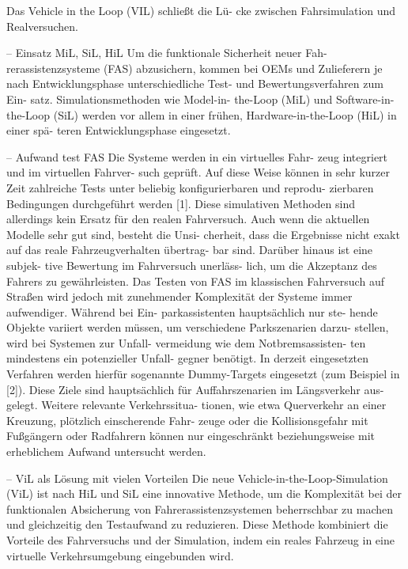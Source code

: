 Das Vehicle in the Loop (VIL) schließt die Lü- cke zwischen Fahrsimulation und Realversuchen.


-- Einsatz MiL, SiL, HiL
Um die funktionale Sicherheit neuer Fah- rerassistenzsysteme (FAS) abzusichern, kommen bei OEMs und Zulieferern je nach Entwicklungsphase unterschiedliche Test- und Bewertungsverfahren zum Ein- satz. Simulationsmethoden wie Model-in- the-Loop (MiL) und Software-in-the-Loop (SiL) werden vor allem in einer frühen, Hardware-in-the-Loop (HiL) in einer spä- teren Entwicklungsphase eingesetzt. \cite{schwab2014durchgangige}

-- Aufwand test FAS
Die Systeme werden in ein virtuelles Fahr- zeug integriert und im virtuellen Fahrver- such geprüft. Auf diese Weise können in sehr kurzer Zeit zahlreiche Tests unter beliebig konfigurierbaren und reprodu- zierbaren Bedingungen durchgeführt werden [1]. Diese simulativen Methoden sind allerdings kein Ersatz für den realen Fahrversuch. Auch wenn die aktuellen Modelle sehr gut sind, besteht die Unsi- cherheit, dass die Ergebnisse nicht exakt auf das reale Fahrzeugverhalten übertrag- bar sind. Darüber hinaus ist eine subjek- tive Bewertung im Fahrversuch unerläss- lich, um die Akzeptanz des Fahrers zu gewährleisten. Das Testen von FAS im klassischen Fahrversuch auf Straßen wird jedoch mit zunehmender Komplexität der Systeme immer aufwendiger. Während bei Ein- parkassistenten hauptsächlich nur ste- hende Objekte variiert werden müssen, um verschiedene Parkszenarien darzu- stellen, wird bei Systemen zur Unfall- vermeidung wie dem Notbremsassisten- ten mindestens ein potenzieller Unfall- gegner benötigt. In derzeit eingesetzten Verfahren werden hierfür sogenannte Dummy-Targets eingesetzt (zum Beispiel in [2]). Diese Ziele sind hauptsächlich für Auffahrszenarien im Längsverkehr aus- gelegt. Weitere relevante Verkehrssitua- tionen, wie etwa Querverkehr an einer Kreuzung, plötzlich einscherende Fahr- zeuge oder die Kollisionsgefahr mit Fußgängern oder Radfahrern können nur eingeschränkt beziehungsweise mit erheblichem Aufwand untersucht werden. \cite{schwab2014durchgangige}

-- ViL als Lösung mit vielen Vorteilen
Die neue Vehicle-in-the-Loop-Simulation (ViL) ist nach HiL und SiL eine innovative Methode, um die Komplexität bei der funktionalen Absicherung von Fahrerassistenzsystemen beherrschbar zu machen und gleichzeitig den Testaufwand zu reduzieren. Diese Methode kombiniert die Vorteile des Fahrversuchs und der Simulation, indem ein reales Fahrzeug in eine virtuelle Verkehrsumgebung eingebunden wird. \cite{schwab2014durchgangige}

